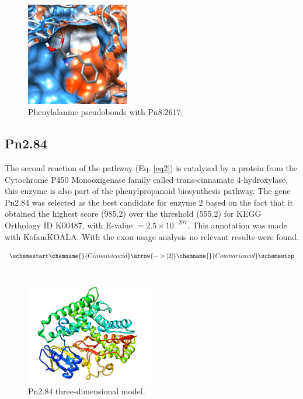 \documentclass[12pt]{article}
\begin{document}
	\FloatBarrier
	\begin{figure}[h!]
		\centering
		\includegraphics[width=0.4\textwidth]{../1/Dock/chimera.png}
		\caption{Phenylalanine pseudobonds with Pn8.2617.}
		\label{fig1_4}
	\end{figure}
	\FloatBarrier
	
	\subsection{Pn2.84}\label{ssec:Pn2.84}
	
	The second reaction of the pathway (Eq. \ref{eq2}) is catalyzed by a protein from the Cytochrome P450 Monooxigenase family called trans-cinnamate 4-hydroxylase, this enzyme is also part of the phenylpropanoid biosynthesis pathway. The gene Pn2.84 was selected as the best candidate for enzyme 2 based on the fact that it obtained the highest score (985.2) over the threshold (555.2) for KEGG Orthology ID K00487, with E-value $=2.5\times10^{-297}$. This annotation was made with KofamKOALA. \cite{kofamkoala} With the exon usage analysis no relevant results were found.
	
	\begin{equation}
	\schemestart
	\label{eq2}
	\chemname{\footnotesize}{Cinnamic acid}\arrow{->[ 2]}\chemname{\footnotesize}{Coumaric acid}
	\schemestop
	\end{equation}\\
	
	\FloatBarrier
	\begin{figure}
		\centering
		\includegraphics[width=0.5\textwidth]{../2/Minimize/model.png}
		\caption{Pn2.84 three-dimensional model.}
		\label{fig2_1}
	\end{figure}
	\FloatBarrier
	
\end{document}
